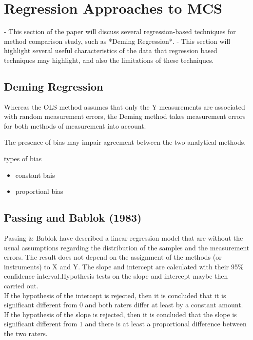 \documentclass[12pt, a4paper]{report}
\theoremstyle{plain}
\theoremstyle{definition}
\theoremstyle{remark}
\begin{document}
\section{Regression Approaches to MCS}
- This section of the paper will discuss several regression-based techniques for method comparison study, 
such as *Deming Regression*. 
- This section will highlight several useful characteristics of the data that 
regression based techniques may highlight, and also the limitations of these techniques.

\subsection*{ Deming Regression}
Whereas the OLS method assumes that only the Y measurements are associated with 
random measurement errors, the Deming method takes measurement errors for both methods of measurement into account.




The presence of bias may impair agreement between the two analytical methods.

types of bias

\begin{itemize}
	\item constant bais
	\item proportionl bias
\end{itemize}

\subsection{Passing and Bablok (1983) }
Passing \& Bablok have described a linear regression model that are without the usual assumptions regarding the distribution of
the samples and the measurement errors. The result does not depend on the assignment of the methods (or instruments) to X and Y. The slope and intercept  are calculated with their 95\% confidence interval.Hypothesis tests on the slope and intercept maybe then
carried out.\\

If the hypothesis of the intercept is rejected, then it is concluded that it is significant different from $0$ and both
raters differ at least by a constant amount.
	\\
If the hypothesis of the slope is rejected, then it is concluded that the slope is significant different from $1$ and there is at
least a proportional difference between the two raters.
\end{document}
